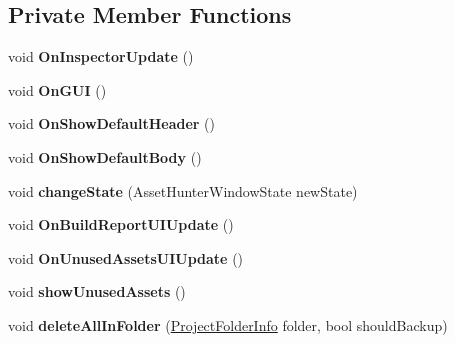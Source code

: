 \subsection*{Private Member Functions}
\begin{DoxyCompactItemize}
\item 
\mbox{\label{class_asset_hunter_main_window_a21ab4ee8d8363d3df234b86eaf260ae2}} 
void {\bfseries On\+Inspector\+Update} ()
\item 
\mbox{\label{class_asset_hunter_main_window_afcd26b80c88312bed89cc68f35dc75dc}} 
void {\bfseries On\+G\+UI} ()
\item 
\mbox{\label{class_asset_hunter_main_window_a020f448ec4261ac52e5abd0a441fc97b}} 
void {\bfseries On\+Show\+Default\+Header} ()
\item 
\mbox{\label{class_asset_hunter_main_window_acd5741f2d888b7856a3a2666141ecf0e}} 
void {\bfseries On\+Show\+Default\+Body} ()
\item 
\mbox{\label{class_asset_hunter_main_window_a00c86d81a167c147025250510843272e}} 
void {\bfseries change\+State} (Asset\+Hunter\+Window\+State new\+State)
\item 
\mbox{\label{class_asset_hunter_main_window_abefd70e9a04f548377b9d09afcbb5bc6}} 
void {\bfseries On\+Build\+Report\+U\+I\+Update} ()
\item 
\mbox{\label{class_asset_hunter_main_window_a49bb3a0b2c05cb9a2d41d905a311731c}} 
void {\bfseries On\+Unused\+Assets\+U\+I\+Update} ()
\item 
\mbox{\label{class_asset_hunter_main_window_a60f020c0f7394a572fd710d6f8d5eead}} 
void {\bfseries show\+Unused\+Assets} ()
\item 
\mbox{\label{class_asset_hunter_main_window_a33be8514a0a79550442f2921afad6c72}} 
void {\bfseries delete\+All\+In\+Folder} (\hyperlink{class_heureka_games_1_1_project_folder_info}{Project\+Folder\+Info} folder, bool should\+Backup)

\end{DoxyCompactItemize}
